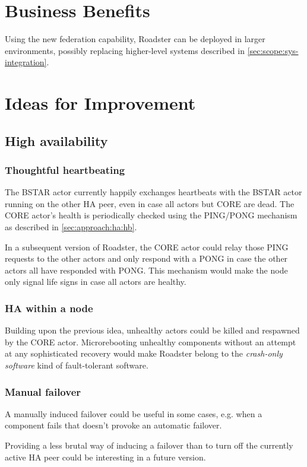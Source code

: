 \section{Business Benefits}
Using the new federation capability, Roadster can be deployed in larger
environments, possibly replacing higher-level systems described in
\autoref{sec:scope:sys-integration}.

\section{Ideas for Improvement}
\subsection{High availability}
\subsubsection{Thoughtful heartbeating}\label{sec:discussion:imp:ha:hb}
The BSTAR actor currently happily exchanges heartbeats with the BSTAR actor
running on the other HA peer, even in case all actors but CORE are dead. The
CORE actor's health is periodically checked using the PING/PONG mechanism as
described in \autoref{sec:approach:ha:hb}.

In a subsequent version of Roadster, the CORE actor could relay those PING
requests to the other actors and only respond with a PONG in case the other
actors all have responded with PONG. This mechanism would make the node only
signal life signs in case all actors are healthy.

\subsubsection{HA within a node}
Building upon the previous idea, unhealthy actors could be killed and respawned
by the CORE actor.  Microrebooting unhealthy components without an attempt at
any sophisticated recovery would make Roadster belong to the \emph{crash-only
software} kind of fault-tolerant software.

\subsubsection{Manual failover}\label{sec:discussion:ha:manual-failover}
A manually induced failover could be useful in some cases, e.g. when a
component fails that doesn't provoke an automatic failover.

Providing a less brutal way of inducing a failover than to turn off the
currently active HA peer could be interesting in a future version.

